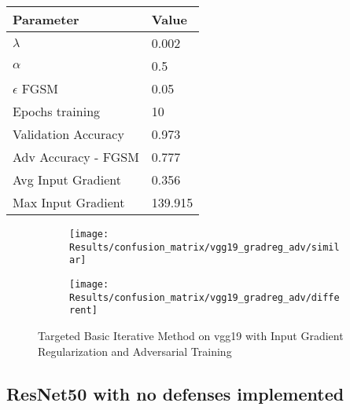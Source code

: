 \documentclass[draft,final]{vutinfth} %
\begin{document}
\begin{table}[h]
  \centering
  \begin{tabular}{ll}
    \toprule
			Parameter			& Value   \\
    \midrule
			$\lambda$								& 0.002				\\
			$\alpha$								& 0.5					\\
			$\epsilon$ FGSM					& 0.05		\\
			Epochs training					& 10			\\
			
			Validation Accuracy			& 0.973		\\ 
			Adv Accuracy - FGSM			& 0.777		\\
			
			Avg Input Gradient			& 0.356	\\
			Max Input Gradient			& 139.915\\
    \bottomrule
  \end{tabular}
\end{table}


\begin{figure}[h]
  \begin{subfigure}[b]{0.5\columnwidth}
		\centering
    \texttt{[image: Results/confusion\_matrix/vgg19\_gradreg\_adv/similar]}
    \label{fig:exp:cm:vgg19_gradreg_adv:similar}
  \end{subfigure}
  \begin{subfigure}[b]{0.5\columnwidth}
		\centering
    \texttt{[image: Results/confusion\_matrix/vgg19\_gradreg\_adv/different]}
    \label{fig:exp:cm:vgg19_gradreg_adv:different}
  \end{subfigure}
  \caption{Targeted Basic Iterative Method on vgg19 with Input Gradient Regularization and Adversarial Training}
  \label{fig:exp:cm:vgg19_gradreg_adv}
\end{figure}
\clearpage

\subsection{ResNet50 with no defenses implemented}
\end{document}
